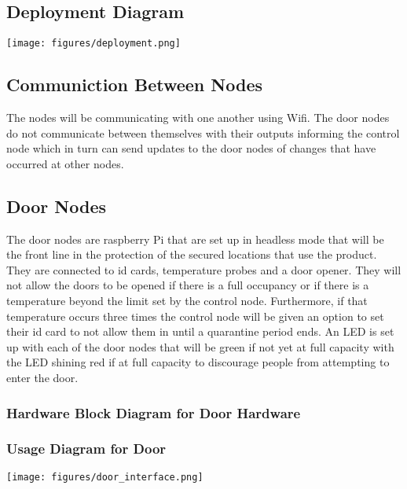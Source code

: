 \subsection{Deployment Diagram}

\texttt{[image: figures/deployment.png]}

\subsection{Communiction Between Nodes}
The nodes will be communicating with one another using Wifi. The door nodes do
not communicate between themselves with their outputs informing the control node
which in turn can send updates to the door nodes of changes that have occurred
at other nodes.

\subsection{Door Nodes}
The door nodes are raspberry Pi that are set up in headless mode that will be
the front line in the protection of the secured locations that use the product.
They are connected to id cards, temperature probes and a door opener. They will
not allow the doors to be opened if there is a full occupancy or if there is a
temperature beyond the limit set by the control node. Furthermore, if that
temperature occurs three times the control node will be given an option to set
their id card to not allow them in until a quarantine period ends. An LED is set
up with each of the door nodes that will be green if not yet at full capacity
with the LED shining red if at full capacity to discourage people from
attempting to enter the door.

\subsubsection{Hardware Block Diagram for Door Hardware}

\subsubsection{Usage Diagram for Door}

\texttt{[image: figures/door\_interface.png]}

